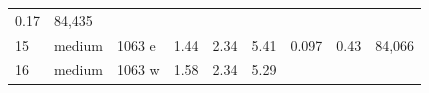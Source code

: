 \documentclass[
  10pt, ]{article}
\begin{document}
\begin{longtable}[]{@{}lllllllll@{}}
\begin{minipage}[t]{0.08\columnwidth}
0.17\strut
\end{minipage} & \begin{minipage}[t]{0.08\columnwidth}\raggedright
84,435\strut
\end{minipage}\tabularnewline
\begin{minipage}[t]{0.08\columnwidth}\raggedright
15\strut
\end{minipage} & \begin{minipage}[t]{0.08\columnwidth}\raggedright
medium\strut
\end{minipage} & \begin{minipage}[t]{0.08\columnwidth}\raggedright
1063 e\strut
\end{minipage} & \begin{minipage}[t]{0.08\columnwidth}\raggedright
1.44\strut
\end{minipage} & \begin{minipage}[t]{0.08\columnwidth}\raggedright
2.34\strut
\end{minipage} & \begin{minipage}[t]{0.08\columnwidth}\raggedright
5.41\strut
\end{minipage} & \begin{minipage}[t]{0.08\columnwidth}\raggedright
0.097\strut
\end{minipage} & \begin{minipage}[t]{0.08\columnwidth}\raggedright
0.43\strut
\end{minipage} & \begin{minipage}[t]{0.08\columnwidth}\raggedright
84,066\strut
\end{minipage}\tabularnewline
\begin{minipage}[t]{0.08\columnwidth}\raggedright
16\strut
\end{minipage} & \begin{minipage}[t]{0.08\columnwidth}\raggedright
medium\strut
\end{minipage} & \begin{minipage}[t]{0.08\columnwidth}\raggedright
1063 w\strut
\end{minipage} & \begin{minipage}[t]{0.08\columnwidth}\raggedright
1.58\strut
\end{minipage} & \begin{minipage}[t]{0.08\columnwidth}\raggedright
2.34\strut
\end{minipage} & \begin{minipage}[t]{0.08\columnwidth}\raggedright
5.29\strut
\end{minipage} & \begin{minipage}[t]{0.08\columnwidth}\raggedright

\end{minipage}
\end{longtable}
\end{document}
